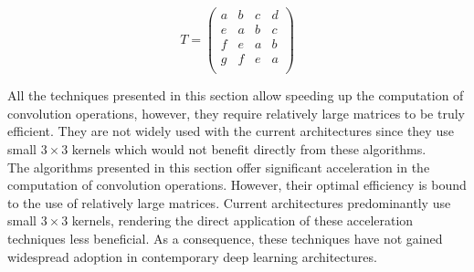 $$
T = 
\left(
\begin{array}{cccc}
a & b & c & d \\
e & a & b & c \\
f & e & a & b \\
g & f & e & a \\
\end{array}
\right)
$$

All the techniques presented in this section allow speeding up the computation
of convolution operations, however, they require relatively large matrices to be
truly efficient. They are not widely used with the current architectures
\cite{DBLP:conf/cvpr/HeZRS16,huang2017densely,liu2018efficient} since they use
small $3 \times 3$ kernels which would not benefit directly from these
algorithms.\\


The algorithms presented in this section offer significant acceleration in the
computation of convolution operations. However, their optimal efficiency is
bound to the use of relatively large matrices. Current architectures
\cite{DBLP:conf/cvpr/HeZRS16, huang2017densely, liu2018efficient} predominantly
use small $3 \times 3$ kernels, rendering the direct application of these
acceleration techniques less beneficial. As a consequence, these techniques have
not gained widespread adoption in contemporary deep learning architectures.